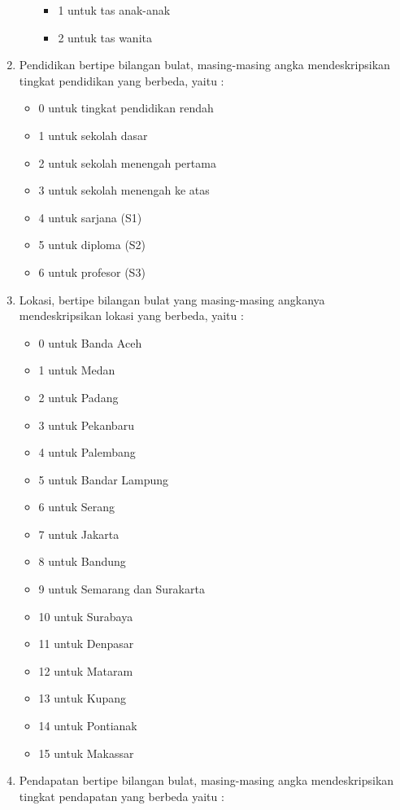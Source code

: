\begin{enumerate}
\begin{itemize}
\begin{itemize}
					\item 1 untuk tas anak-anak
					\item 2 untuk tas wanita
				\end{itemize}
		\end{itemize}
		\item Pendidikan bertipe bilangan bulat, masing-masing angka mendeskripsikan tingkat pendidikan yang berbeda, yaitu :
		\begin{itemize}
					\item 0 untuk tingkat pendidikan rendah
					\item 1 untuk sekolah dasar
					\item 2 untuk sekolah menengah pertama
					\item 3 untuk sekolah menengah ke atas
					\item 4 untuk sarjana (S1)
					\item 5 untuk diploma (S2)
					\item 6 untuk profesor (S3)
				\end{itemize}
		\item Lokasi, bertipe bilangan bulat yang masing-masing angkanya mendeskripsikan lokasi yang berbeda, yaitu :
			\begin{itemize}
				\item 0 untuk Banda Aceh
				\item 1 untuk Medan
				\item 2 untuk Padang
				\item 3 untuk Pekanbaru
				\item 4 untuk Palembang
				\item 5 untuk Bandar Lampung
				\item 6 untuk Serang
				\item 7 untuk Jakarta
				\item 8 untuk Bandung
				\item 9 untuk Semarang dan Surakarta
				\item 10 untuk Surabaya
				\item 11 untuk Denpasar
				\item 12 untuk Mataram
				\item 13 untuk Kupang
				\item 14 untuk Pontianak
				\item 15 untuk Makassar
			\end{itemize}
		\item Pendapatan bertipe bilangan bulat, masing-masing angka mendeskripsikan tingkat pendapatan yang berbeda yaitu :
			\begin{itemize}

\end{itemize}
\end{enumerate}

